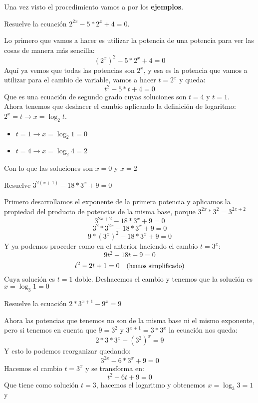 \documentclass[a4paper,11pt,answers]{exam}
\begin{document}
\begin{itemize}
  Una vez visto el procedimiento vamos a por los \textbf{ejemplos}.
  \begin{questions}
  \question Resuelve la ecuación $2^{2x} - 5*2^x + 4 = 0$.
    \begin{solution}
      Lo primero que vamos a hacer es utilizar la potencia de una potencia para ver las cosas de
      manera más sencilla:
      \[\left( 2^x \right)^2 - 5*2^x + 4 = 0\]
      Aquí ya vemos que todas las potencias son $2^x$, y esa es la potencia que vamos a utilizar
      para el cambio de variable, vamos a hacer $t = 2^x$ y queda:
      \[t^2 - 5*t +4 = 0\]
      Que es una ecuación de segundo grado cuyas soluciones son $t = 4$ y $t = 1$.\\
      Ahora tenemos que deshacer el cambio aplicando la definición de logaritmo: $2^x = t \longrightarrow x = \log_2 t$.
      \begin{itemize}
      \item $t = 1 \longrightarrow x = \log_2 1 = 0$
      \item $t = 4 \longrightarrow x = \log_2 4 = 2$
      \end{itemize}
      Con lo que las soluciones son $x = 0$ y $x = 2$
    \end{solution}
  \question Resuelve $3^{2(x+1)} -18 *3^x +9 = 0$
    \begin{solution}
      Primero desarrollamos el exponente de la primera potencia y aplicamos la propiedad del
      producto de potencias de la misma base, porque $3^{2x}*3^2 = 3^{2x+2}$
      \[3^{2x + 2} - 18*3^x + 9 = 0\]
      \[3^2*3^{2x} - 18*3^x + 9 = 0\]
      \[9*\left(3^x\right)^2 - 18*3^x + 9 = 0\]
      Y ya podemos proceder como en el anterior haciendo el cambio $t = 3^x$:
      \[9t^2 - 18t + 9 = 0\]
      \[t^2 - 2t + 1 = 0\quad\text{\small{(hemos simplificado)}}\]
      Cuya solución es $t = 1$ doble.
      Deshacemos el cambio y tenemos que la solución es $x = \log_3 1= 0$
    \end{solution}
  \question Resuelve la ecuación $2*3^{x+1} - 9^x = 9$
    \begin{solution}
      Ahora las potencias que tenemos no son de la misma base ni el mismo exponente, pero si
      tenemos en cuenta que $9 = 3^2$ y $3^{x+1} = 3*3^x$ la ecuación nos queda:
      \[2*3*3^x - \left(3^2\right)^x = 9\]
      Y esto lo podemos reorganizar quedando:
      \[3^{2x} - 6*3^x + 9 = 0\]
      Hacemos el cambio $t = 3^x$ y se transforma en:
      \[t^2 - 6t + 9 = 0\]
      Que tiene como solución $t=3$, hacemos el logaritmo y obtenemos $x = \log_3 3 = 1$ y

\end{solution}
\end{questions}
\end{itemize}
\end{document}
